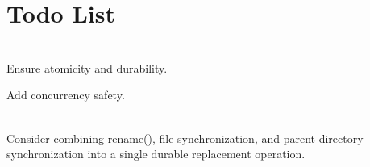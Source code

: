 \chapter{Todo List }
\hypertarget{todo}{}\label{todo}

\begin{DoxyRefList}
\item[{\parbox[t]{\linewidth}{File \doxylink{file_8h}{file.h} }}]\hfill \\
\label{todo__todo000001}%
%
Ensure atomicity and durability. 



Add concurrency safety.  
\item[{\parbox[t]{\linewidth}{Member \doxylink{class_writable_file_a8c73c0150ee87bce4c1299a4bb2349ad}{Writable\+File::\+durable\+\_\+rename} (const std::\+filesystem::\+path \&to, bool replace\+\_\+existing)=0}}]\hfill \\
\label{todo__todo000002}%
%
Consider combining rename(), file synchronization, and parent-\/directory synchronization into a single durable replacement operation.
\end{DoxyRefList}